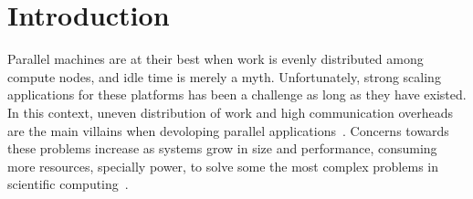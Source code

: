 \section{Introduction}


%
%
%
%
%
%
%
%
%

Parallel machines are at their best when work is evenly distributed among compute nodes, and idle time is merely a myth.
Unfortunately, strong scaling applications for these platforms has been a challenge as long as they have existed.
In this context, uneven distribution of work and high communication overheads are the main villains when devoloping parallel applications~\cite{Deveci2015, commaware}.
Concerns towards these problems increase as systems grow in size and performance, consuming more resources, specially power, to solve some the most complex problems in scientific computing~\cite{exapower2015,padoin2017energy}.

